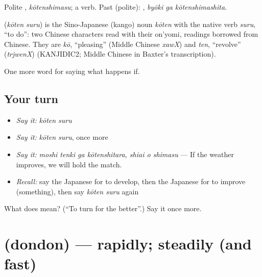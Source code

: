 Polite \textbf{}, \emph{kōtenshimasu}; a  verb. Past (polite): \textbf{ }, \emph{byōki ga kōtenshimashita}.

\begin{cousinweb}
\textbf{} (\emph{kōten suru}) is the Sino-Japanese (kango) noun \emph{kōten} with the native verb \emph{suru}, \textquotedblleft{}to do\textquotedblright{}: two Chinese characters read with their on'yomi, readings borrowed from Chinese. They are \emph{kō}, \textquotedblleft{}pleasing\textquotedblright{} (Middle Chinese \emph{xawX}) and \emph{ten}, \textquotedblleft{}revolve\textquotedblright{} (\emph{trjwenX}) (KANJIDIC2; Middle Chinese in Baxter's transcription).
\end{cousinweb}

\begin{grammarlens}[title={What you've built}]
One more word for saying what happens if.
\end{grammarlens}

\subsection*{Your turn}
\begin{itemize}
\raggedright
  \item \emph{Say it:} \emph{kōten suru}
  \item \emph{Say it:} \emph{kōten suru}, once more
  \item \emph{Say it:} \emph{moshi tenki ga kōtenshitara, shiai o shimasu} — If the weather improves, we will hold the match.
  \item \emph{Recall:} say the Japanese for to develop, then the Japanese for to improve (something), then say \emph{kōten suru} again
\end{itemize}

\begin{tcolorbox}[breakable,colback=teal!4,colframe=teal!35!black,title={Before you move on}]
What does  mean? (\textquotedblleft{}To turn for the better\textquotedblright{}.) Say it once more.
\end{tcolorbox}
\section[\texorpdfstring{\ja{どんどん} (dondon)}{どんどん (dondon)}]{ (dondon) — rapidly; steadily (and fast)}

\label{lesson:JA-C526-dondon}



